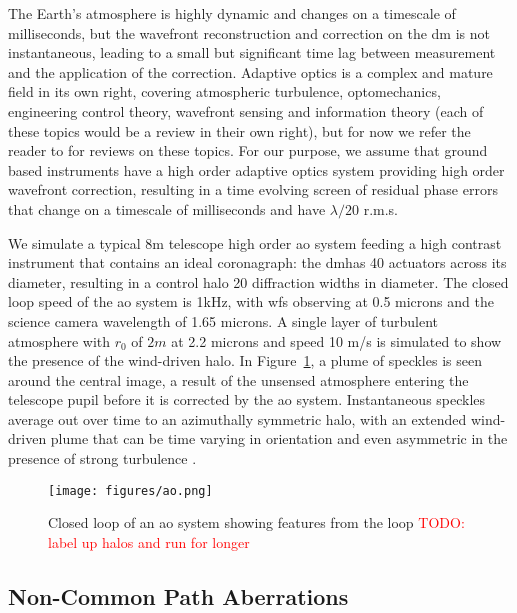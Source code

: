 \documentclass[letterpaper]{ar-1col}
\begin{document}
The Earth's atmosphere is highly dynamic and changes on a timescale of milliseconds, but the wavefront reconstruction and correction on the \ac{dm} is not instantaneous, leading to a small but significant time lag between measurement and the application of the correction.
%
Adaptive optics is a complex and mature field in its own right, covering atmospheric turbulence, optomechanics, engineering control theory, wavefront sensing and information theory (each of these topics would be a review in their own right), but for now we refer the reader to \citet{Guyon18} for reviews on these topics. 
%
For our purpose, we assume that ground based instruments have a high order adaptive optics system providing high order wavefront correction, resulting in a time evolving screen of residual phase errors that change on a timescale of milliseconds and have $\lambda/20$ r.m.s.

We simulate a typical 8m telescope high order \ac{ao} system feeding a high contrast instrument that contains an ideal coronagraph: the \ac{dm}has 40 actuators across its diameter, resulting in a control halo 20 diffraction widths in diameter. 
%
The closed loop speed of the \ac{ao} system is 1kHz, with \ac{wfs} observing at 0.5 microns and the science camera wavelength of 1.65 microns.
%
A single layer of turbulent atmosphere with $r_0$ of $2m$ at 2.2 microns and speed 10 m/s is simulated to show the presence of the wind-driven halo.
%
In Figure~\ref{fig:ao}, a plume of speckles is seen around the central image, a result of the unsensed atmosphere entering the telescope pupil before it is corrected by the \ac{ao} system. 
%
Instantaneous speckles average out over time to an azimuthally symmetric halo, with an extended wind-driven plume that can be time varying in orientation and even asymmetric in the presence of strong turbulence \citep{Cantalloube18}.


\begin{figure}[ht]
  \centering
  \texttt{[image: figures/ao.png]}
  \caption{Closed loop of an \ac{ao} system showing features from the loop \textcolor{red}{TODO: label up halos and run for longer}}
  \label{fig:ao}
\end{figure}

\subsection{Non-Common Path Aberrations}
\end{document}
